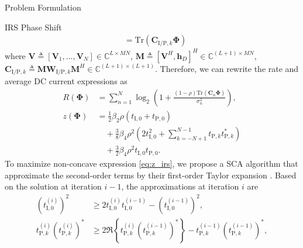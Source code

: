 \documentclass[journal]{IEEEtran}
\begin{document}
\begin{section}{Problem Formulation}
\begin{subsection}{IRS Phase Shift}
\begin{align}
				& = \mathrm{Tr}(\boldsymbol{C}_{\mathrm{I/P},k}\boldsymbol{\Phi})
			\end{align}
			where $\boldsymbol{V} \triangleq [\boldsymbol{V}_1,\dots,\boldsymbol{V}_N] \in \mathbb{C}^{L \times MN}$, $\boldsymbol{M} \triangleq [\boldsymbol{V}^H, \boldsymbol{h}_{D}]^H \in \mathbb{C}^{(L+1) \times MN}$, $\boldsymbol{C}_{\mathrm{I/P},k} \triangleq \boldsymbol{M}\boldsymbol{W}_{\mathrm{I/P},k}\boldsymbol{M}^H \in \mathbb{C}^{(L+1)\times(L+1)}$. Therefore, we can rewrite the rate and average DC current expressions as
			\begin{align}
				R(\boldsymbol{\Phi})
				& = \sum_{n=1}^{N}{\log_2\left(1+\frac{(1-\rho)\mathrm{Tr}(\boldsymbol{C}_n\boldsymbol{\Phi})}{\sigma_n^2}\right)},\label{eq:R_irs}\\
				z(\boldsymbol{\Phi})
				& = \frac{1}{2}{\beta_2}{\rho}(t_{\mathrm{I},0}+t_{\mathrm{P},0})\nonumber\\
				& \quad + \frac{3}{8}{\beta_4}{\rho^2} \left(2t_{\mathrm{I},0}^2 + \sum_{k=-N+1}^{N-1}{t_{\mathrm{P},k}t_{\mathrm{P},k}^*}\right)\nonumber\\
				& \quad + \frac{3}{2}{\beta_4}{\rho^2}t_{\mathrm{I},0}t_{\mathrm{P},0}.\label{eq:z_irs}
			\end{align}
			To maximize non-concave expression \eqref{eq:z_irs}, we propose a SCA algorithm that approximate the second-order terms by their first-order Taylor expansion \cite{Adali2010}. Based on the solution at iteration $i - 1$, the approximations at iteration $i$ are
			\begin{align}
				(t_{\mathrm{I},0}^{(i)})^2
				& \ge 2 t_{\mathrm{I},0}^{(i)}t_{\mathrm{I},0}^{(i-1)} - (t_{\mathrm{I},0}^{(i-1)})^2,\label{eq:taylor_1}\\
				t_{\mathrm{P},k}^{(i)} (t_{\mathrm{P},k}^{(i)})^*
				& \ge 2 \Re\left\{t_{\mathrm{P},k}^{(i)} (t_{\mathrm{P},k}^{(i-1)})^*\right\} - t_{\mathrm{P},k}^{(i-1)} (t_{\mathrm{P},k}^{(i-1)})^*,\label{eq:taylor_2}\\

\end{align}
\end{subsection}
\end{section}
\end{document}

